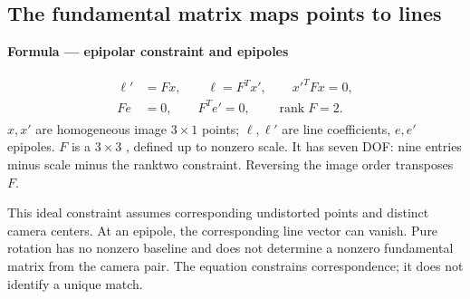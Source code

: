 \documentclass[letterpaper,11pt,english,openany,oneside]{jupyterBook}
\begin{document}
\subsection{The fundamental matrix maps points to lines}
\label{\detokenize{lectures/lecture02/two-view:the-fundamental-matrix-maps-points-to-lines}}
\begin{TextbookBox}
\textbf{Formula — epipolar constraint and epipoles}\par\smallskip
\begin{equation}\label{equation:lectures/lecture02/two-view:eq-lec02-fundamental}
\begin{split}\begin{aligned}
\ell'&=Fx,\qquad \ell=F^Tx',\qquad x'^TFx=0,\\
Fe&=0,\qquad F^Te'=0,\qquad \operatorname{rank}F=2.
\end{aligned}\end{split}
\end{equation}
\sphinxAtStartPar
\(x,x'\) are homogeneous image \(3\times1\) points; \(\ell,\ell'\) are line coefficients, \(e,e'\) epipoles. \(F\) is a \(3\times3\) , defined up to nonzero scale. It has seven DOF: nine entries minus scale minus the rank\sphinxhyphen{}two constraint. Reversing the image order transposes \(F\).

\sphinxAtStartPar
This ideal constraint assumes corresponding undistorted points and distinct camera centers. At an epipole, the corresponding line vector can vanish. Pure rotation has no nonzero baseline and does not determine a nonzero fundamental matrix from the camera pair. The equation constrains correspondence; it does not identify a unique match.

\end{TextbookBox}
\end{document}
